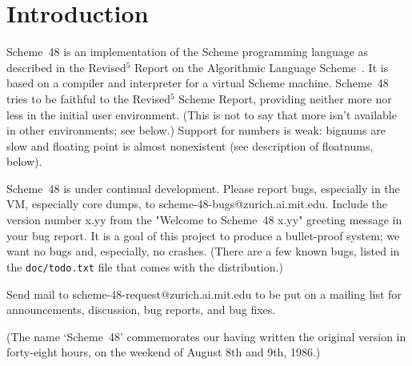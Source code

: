 
\chapter{Introduction}

Scheme~48 is an implementation of the Scheme programming language as
described in the Revised$^5$ Report on the Algorithmic Language
 Scheme~\cite{R5RS}.
It is based on a compiler and interpreter for a virtual Scheme
machine.  Scheme~48 tries to be faithful to the Revised$^5$ Scheme
Report, providing neither more nor less in the initial user
environment.  (This is not to say that more isn't available in other
environments; see below.)  Support for numbers is weak: bignums are
slow and floating point is almost nonexistent (see description of
floatnums, below).

Scheme~48 is under continual development.
Please report bugs, especially in the VM, especially core dumps, to
scheme-48-bugs@zurich.ai.mit.edu.  Include the version number x.yy
from the "Welcome to Scheme~48 x.yy" greeting message in your bug
report.  It is a goal of this project to produce a bullet-proof
system; we want no bugs and, especially, no crashes.  (There are a few
known bugs, listed in the {\tt doc/todo.txt} file that comes with the
distribution.)

Send mail to scheme-48-request@zurich.ai.mit.edu to be put on a
mailing list for announcements, discussion, bug reports, and bug
fixes.

(The name `Scheme~48' commemorates our having written the original version
 in forty-eight hours, on the weekend of August 8th and 9th, 1986.)

